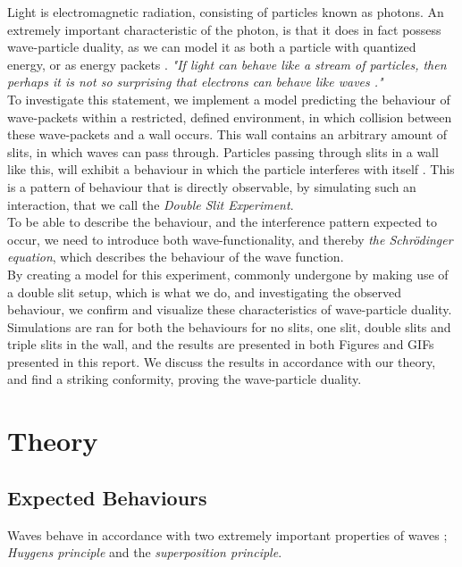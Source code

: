 \documentclass[10pt, nofootinbib, twocolumn]{revtex4-1}
\begin{document}
Light is electromagnetic radiation, consisting of particles known as photons. An extremely important characteristic of the photon, is that it does in fact possess wave-particle duality, as we can model it as both a particle with quantized energy, or as energy packets \cite{kvante}. \textit{"If light can behave like a stream of particles, then perhaps it is not so surprising that electrons can behave like waves \cite{thermal}."}\\
\newpage
\vspace*{2\baselineskip}
To investigate this statement, we implement a model predicting the behaviour of wave-packets within a restricted, defined environment, in which collision between these wave-packets and a wall occurs. This wall contains an arbitrary amount of slits, in which waves can pass through. Particles passing through slits in a wall like this, will exhibit a behaviour in which the particle interferes with itself \cite{kvante}. This is a pattern of behaviour that is directly observable, by simulating such an interaction, that we call the \textit{Double Slit Experiment}. \\

To be able to describe the behaviour, and the interference pattern expected to occur, we need to introduce both wave-functionality, and thereby \textit{the Schrödinger equation}, which describes the behaviour of the wave function. \\

By creating a model for this experiment, commonly undergone by making use of a double slit setup, which is what we do, and investigating the observed behaviour, we confirm and visualize these characteristics of wave-particle duality. Simulations are ran for both the behaviours for no slits, one slit, double slits and triple slits in the wall, and the results are presented in both Figures and GIFs presented in this report. We discuss the results in accordance with our theory, and find a striking conformity, proving the wave-particle duality.




\clearpage
\section{Theory}\label{sec:theory}
\subsection{Expected Behaviours}\label{sec:behaviour}
Waves behave in accordance with two extremely important properties of waves ; \textit{Huygens principle} and the \textit{superposition principle}.
\end{document}

